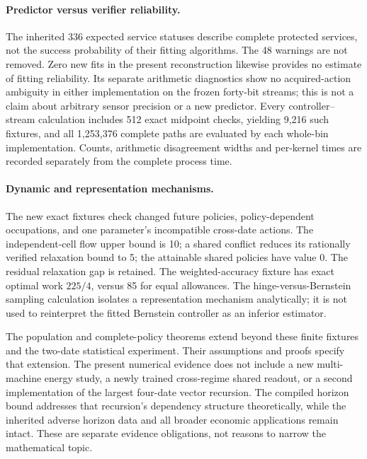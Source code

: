 \paragraph{Predictor versus verifier reliability.}
The inherited 336 expected service statuses describe complete protected services, not the success probability of their fitting algorithms. The 48 warnings are not removed. Zero new fits in the present reconstruction likewise provides no estimate of fitting reliability. Its separate arithmetic diagnostics show no acquired-action ambiguity in either implementation on the frozen forty-bit streams; this is not a claim about arbitrary sensor precision or a new predictor. Every controller--stream calculation includes 512 exact midpoint checks, yielding 9,216 such fixtures, and all 1,253,376 complete paths are evaluated by each whole-bin implementation. Counts, arithmetic disagreement widths and per-kernel times are recorded separately from the complete process time.

\paragraph{Dynamic and representation mechanisms.}
The new exact fixtures check changed future policies, policy-dependent occupations, and one parameter's incompatible cross-date actions. The independent-cell flow upper bound is 10; a shared conflict reduces its rationally verified relaxation bound to 5; the attainable shared policies have value 0. The residual relaxation gap is retained. The weighted-accuracy fixture has exact optimal work $225/4$, versus 85 for equal allowances. The hinge-versus-Bernstein sampling calculation isolates a representation mechanism analytically; it is not used to reinterpret the fitted Bernstein controller as an inferior estimator.



The population and complete-policy theorems extend beyond these finite fixtures and the two-date statistical experiment. Their assumptions and proofs specify that extension. The present numerical evidence does not include a new multi-machine energy study, a newly trained cross-regime shared readout, or a second implementation of the largest four-date vector recursion. The compiled horizon bound addresses that recursion's dependency structure theoretically, while the inherited adverse horizon data and all broader economic applications remain intact. These are separate evidence obligations, not reasons to narrow the mathematical topic.
